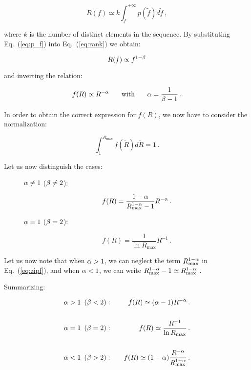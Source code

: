 \documentclass[graybox]{svmult}
\newcommand{\Eq}[1]{Eq.~(\ref{#1})}
\begin{document}
\begin{equation}\label{eq:rank}
R(f) \simeq  k \int_{f}^{+\infty} p(\tilde{f}) d\tilde{f}   \,,
\end{equation}

\noindent where $k$ is the number of distinct elements in the sequence. 
By substituting \Eq{eq:p_f} into \Eq{eq:rank} we obtain:

\begin{equation}\label{eq:f_rank}
R(f)\propto    f^{1-\beta}    
\end{equation}

\noindent and inverting the relation:

\begin{equation}
 f(R) \propto R^{-\alpha}  \,\,\,\,\,\,\,\,\,\,\, \text{with} \,\,\,\,\,\,\,\,\,\,\, \alpha = \frac{1}{\beta -1} \, .
\end{equation}

\noindent In order to obtain the correct expression for $f(R)$, we now have to consider the normalization:

\begin{equation}
\int_{1}^{R_{\max}} f(\tilde{R}) d  \tilde{R} = 1 \,.
\end{equation}


\noindent Let us now distinguish the cases:

\begin{description}

\item[] $\alpha \neq 1$ ($\beta \neq 2$):

\begin{equation} \label{eq:zipf}
 f(R) =  \frac {1-\alpha}{R_{\max}^{1-\alpha} -1}  R^{-\alpha} \,.
\end{equation}


\item[] $\alpha = 1$  ($\beta=2$):


\begin{equation}
 f(R) = \frac {1} {\ln{R_{\max}}} R^{-1} \,.
\end{equation}

\end{description}

\noindent Let us now note that when $\alpha >1$, we can neglect the term $R_{\max}^{1-\alpha}$ in \Eq{eq:zipf}, and when $\alpha <1$, we can write $R_{\max}^{1-\alpha} -1 \simeq R_{\max}^{1-\alpha} $ .

Summarizing:

\begin{eqnarray}
\alpha >1 \,\,\, (\beta<2): && \,\,\,\,\,\,
f(R) \simeq  (\alpha -1)  R^{-\alpha} \,. \label{eqn1:zipf}\\
&& \nonumber \\
\alpha = 1  \,\,\,  (\beta=2): &&\,\,\,\,\,\,
 f(R) \simeq \frac {R^{-1}} {\ln{R_{\max}}} \,. \label{eqn2:zipf}\\
&& \nonumber \\
\alpha<1\,\,\,  (\beta>2): && \,\,\,\,\,\, 
 f(R) \simeq (1-\alpha) \frac {R^{-\alpha}}{R_{\max}^{1-\alpha} }  \,.\label{eqn3:zipf}
\end{eqnarray}
\end{document}
